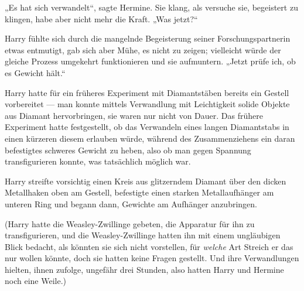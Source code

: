 „Es hat sich verwandelt“, sagte Hermine. Sie klang, als versuche sie, begeistert zu klingen, habe aber nicht mehr die Kraft.
„Was jetzt?“

Harry fühlte sich durch die mangelnde Begeisterung seiner Forschungspartnerin etwas entmutigt, gab sich aber Mühe, es nicht zu zeigen; vielleicht würde der gleiche Prozess umgekehrt funktionieren und sie aufmuntern.
„Jetzt prüfe ich, ob es Gewicht hält.“

Harry hatte für ein früheres Experiment mit Diamantstäben bereits ein Gestell vorbereitet — man konnte mittels Verwandlung mit Leichtigkeit solide Objekte aus Diamant hervorbringen, sie waren nur nicht von Dauer. Das frühere Experiment hatte festgestellt, ob das Verwandeln eines langen Diamantstabs in einen kürzeren diesem erlauben würde, während des Zusammenziehens ein daran befestigtes schweres Gewicht zu heben, also ob man gegen Spannung transfigurieren konnte, was tatsächlich möglich war.

Harry streifte vorsichtig einen Kreis aus glitzerndem Diamant über den dicken Metallhaken oben am Gestell, befestigte einen starken Metallaufhänger am unteren Ring und begann dann, Gewichte am Aufhänger anzubringen.

(Harry hatte die Weasley-Zwillinge gebeten, die Apparatur für ihn zu transfigurieren, und die Weasley-Zwillinge hatten ihn mit einem ungläubigen Blick bedacht, als könnten sie sich nicht vorstellen, für \emph{welche} Art Streich er das nur wollen könnte, doch sie hatten keine Fragen gestellt. Und ihre Verwandlungen hielten, ihnen zufolge, ungefähr drei Stunden, also hatten Harry und Hermine noch eine Weile.)

